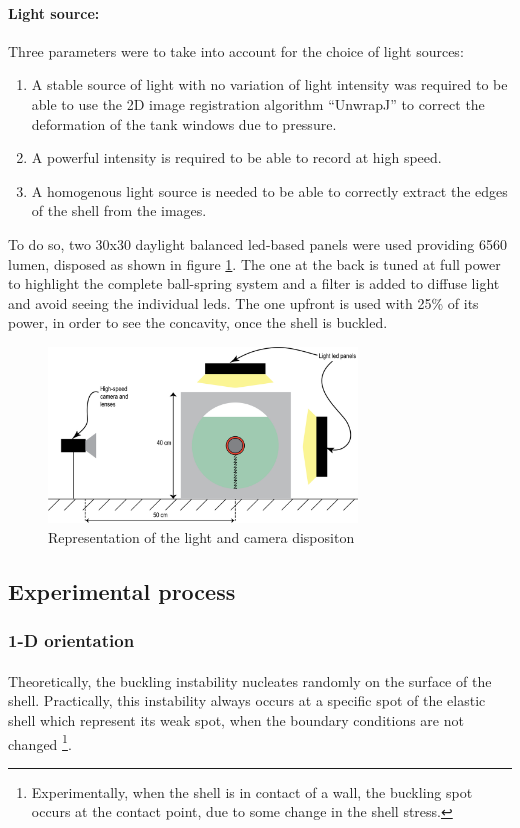 \paragraph{Light source:}
Three parameters were to take into account for the choice of light sources:
\begin{enumerate}
	\item A stable source of light with no variation of light intensity was required to be able to use the 2D image registration algorithm "`UnwrapJ"' to correct the deformation of the tank windows due to pressure.
	\item A powerful intensity is required to be able to record at high speed.
	\item A homogenous light source is needed to be able to correctly extract the edges of the shell from the images.	
\end{enumerate}
To do so, two 30x30 daylight balanced led-based panels were used providing 6560 lumen, disposed as shown in figure \ref{fig:schematics_spring}. The one at the back is tuned at full power to highlight the complete ball-spring system and a filter is added to diffuse light and avoid seeing the individual leds. The one upfront is used with 25\% of its power, in order to see the concavity, once the shell is buckled.
\begin{figure}[H] %
	\centering%
  \includegraphics[width=0.73\textwidth]{figures/Chapter_1/schematic_experimental_setup_light_lenses.png}
	\caption{Representation of the light and camera dispositon}
	\label{fig:schematics_spring}
\end{figure}
\newpage
\subsection{Experimental process}
\subsubsection{1-D orientation}
\paragraph{}
Theoretically, the buckling instability nucleates randomly  on the surface of the shell. Practically, this instability always occurs at a specific spot of the elastic shell which represent its weak spot, when the boundary conditions are not changed \footnote{Experimentally, when the shell is in contact of a wall, the buckling spot occurs at the contact point, due to some change in the shell stress.}.
